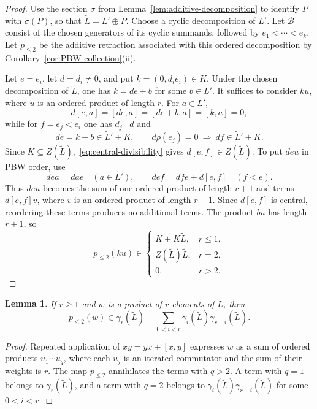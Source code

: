 \documentclass[a4paper,11pt,reqno]{amsart}
\newtheorem{lemma}[theorem]{Lemma}
\theoremstyle{definition}
\begin{document}
\begin{proof}
Use the section $\sigma$ from Lemma~\ref{lem:additive-decomposition} to
identify $P$ with $\sigma(P)$, so that
$\widetilde L=L'\oplus P$.  Choose a cyclic decomposition of $L'$.  Let
$\mathcal B$ consist of the chosen generators of its cyclic summands,
followed by $e_1<\cdots<e_k$.
Let $p_{\leq2}$ be the additive retraction associated with this ordered
decomposition by Corollary~\ref{cor:PBW-collection}\textup{(ii)}.

Let $e=e_i$, let $d=d_i\neq0$, and put $k=(0,d_i e_i)\in K$.  Under the
chosen decomposition of $\widetilde L$, one has $k=de+b$ for some
$b\in L'$.  It suffices to consider $ku$, where $u$ is an ordered product
of length $r$.  For $a\in L'$,
\[
                         d[e,a]=[de,a]=[de+b,a]=[k,a]=0,
\]
while for $f=e_j<e_i$ one has $d_j\mid d$ and
\[
 de=k-b\in\widetilde L'+K,
 \qquad
 d\rho(e_j)=0\ \Longrightarrow\ df\in\widetilde L'+K.
\]
Since $K\subseteq Z(\widetilde L)$,~\eqref{eq:central-divisibility} gives
$d[e,f]\in Z(\widetilde L)$.  To put $deu$ in PBW order, use
\[
 dea=dae \quad (a\in L'),
 \qquad
 def=dfe+d[e,f] \quad (f<e).
\]
Thus $deu$ becomes the sum of one ordered product of length $r+1$ and terms
$d[e,f]v$, where $v$ is an ordered product of length $r-1$.  Since
$d[e,f]$ is central, reordering these terms produces no additional terms.
The product $bu$ has length $r+1$, so
\[
 p_{\leq2}(ku)\in
 \begin{cases}
  K+K\widetilde L,&r\leq1,\\
  Z(\widetilde L)\widetilde L,&r=2,\\
  0,&r>2.
 \end{cases}
\]
\end{proof}

\begin{lemma}\label{lem:weight-collection}
If $r\geq1$ and $w$ is a product of $r$ elements of $\widetilde L$, then
\[
 p_{\leq2}(w)\in
 \gamma_r(\widetilde L)
 +\sum_{0<i<r}\gamma_i(\widetilde L)\gamma_{r-i}(\widetilde L).
\]
\end{lemma}

\begin{proof}
Repeated application of $xy=yx+[x,y]$ expresses $w$ as a sum of ordered
products $u_1\cdots u_q$, where each $u_j$ is an iterated commutator and the
sum of their weights is $r$.  The map $p_{\leq2}$ annihilates the terms with
$q>2$.  A term with $q=1$ belongs to $\gamma_r(\widetilde L)$, and a term
with $q=2$ belongs to
$\gamma_i(\widetilde L)\gamma_{r-i}(\widetilde L)$ for some $0<i<r$.
\end{proof}
\end{document}
